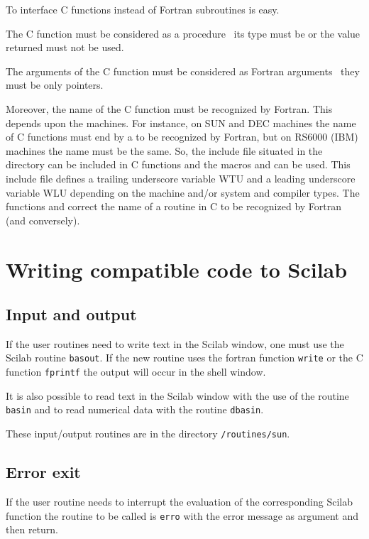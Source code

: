 To interface C functions instead of Fortran subroutines is easy.

The C function must be considered as a procedure \ie\
its type must be  or the value returned must not be used.

The arguments of the C function must be considered as Fortran arguments \ie\
they must be only pointers.

Moreover, the name of the C function must be recognized by Fortran. This
depends upon the machines. For instance, on SUN and DEC machines the name of C
functions must end by a \T{\_} to be recognized by Fortran, but on RS6000
(IBM) machines the name must be the same. So, the include file \T{machine.h}
situated in the
directory \M{Scilab directory}\T{/routines} can be included in C functions and
the macros  and  can be used. This include file defines
a trailing underscore variable WTU and a leading underscore variable WLU
depending on the machine and/or system and compiler types. The functions
 \T{C2F} and \T{F2C} correct the name of a routine in C to be
recognized by Fortran (and conversely).

\section{Writing compatible code to Scilab}
\label{compat}

\subsection{Input and output}
If the user routines need to write text in the Scilab window, one must use 
the Scilab routine {\tt basout}. If the new routine uses the fortran 
function {\tt write} or the C function {\tt fprintf} the output will
occur in the shell window.

It is also possible to read text in the Scilab window with the use of the routine {\tt basin} and to read numerical data with the routine {\tt dbasin}.

These input/output routines are in the directory 
{\tt <scilab dir>/routines/sun}.

\subsection{Error exit}
If the user routine needs to interrupt the evaluation of the corresponding 
Scilab function the routine to be called is {\tt erro} with the error message
as argument and then return.

